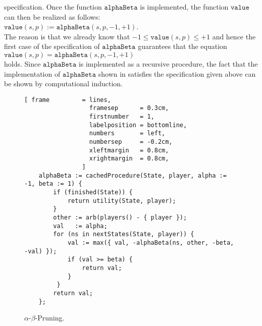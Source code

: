 specification.  Once the function $\texttt{alphaBeta}$ is implemented, the function $\texttt{value}$ can then
be realized as follows: 
\\[0.2cm]
\hspace*{1.3cm}
$\texttt{value}(s, p ) := \texttt{alphaBeta}(s, p, -1, +1)$.
\\[0.2cm]
The reason is that we already know that $-1 \leq \texttt{value}(s,p) \leq +1$ and hence the first case of the
specification of $\texttt{alphaBeta}$ guarantees that the equation
\\[0.2cm]
\hspace*{1.3cm}
$\texttt{value}(s,p) = \texttt{alphaBeta}(s,p,-1,+1)$
\\[0.2cm]
holds.  Since $\texttt{alphaBeta}$ is implemented as a recursive procedure, 
the fact that the implementation of $\texttt{alphaBeta}$ shown in  satisfies the
specification given above can be shown by computational induction.  


\begin{figure}[!ht]
\centering
\begin{Verbatim}[ frame         = lines, 
                  framesep      = 0.3cm, 
                  firstnumber   = 1,
                  labelposition = bottomline,
                  numbers       = left,
                  numbersep     = -0.2cm,
                  xleftmargin   = 0.8cm,
                  xrightmargin  = 0.8cm,
                ]
    alphaBeta := cachedProcedure(State, player, alpha := -1, beta := 1) {
        if (finished(State)) {
            return utility(State, player);
        }
        other := arb(players() - { player });
        val   := alpha;
        for (ns in nextStates(State, player)) {
            val := max({ val, -alphaBeta(ns, other, -beta, -val) });
            if (val >= beta) {
                return val;
            }
         }
        return val;
    };
\end{Verbatim}
\vspace*{-0.3cm}
\caption{$\alpha$-$\beta$-Pruning.}
\label{fig:game-alpha-beta.stlx}
\end{figure}

